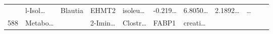 \documentclass[
]{article}
\begin{document}
\begin{longtable}[]{@{}lllllllllll@{}}
\begin{minipage}[t]{0.07\columnwidth}
\strut
\end{minipage} & \begin{minipage}[t]{0.09\columnwidth}\raggedright
l-Isol\ldots{}\strut
\end{minipage} & \begin{minipage}[t]{0.07\columnwidth}\raggedright
Blautia\strut
\end{minipage} & \begin{minipage}[t]{0.07\columnwidth}\raggedright
EHMT2\strut
\end{minipage} & \begin{minipage}[t]{0.09\columnwidth}\raggedright
isoleu\ldots{}\strut
\end{minipage} & \begin{minipage}[t]{0.07\columnwidth}\raggedright
-0.219\ldots{}\strut
\end{minipage} & \begin{minipage}[t]{0.07\columnwidth}\raggedright
6.8050\ldots{}\strut
\end{minipage} & \begin{minipage}[t]{0.07\columnwidth}\raggedright
2.1892\ldots{}\strut
\end{minipage} & \begin{minipage}[t]{0.03\columnwidth}\raggedright
\ldots{}\strut
\end{minipage}\tabularnewline
\begin{minipage}[t]{0.05\columnwidth}\raggedright
588\strut
\end{minipage} & \begin{minipage}[t]{0.07\columnwidth}\raggedright
Metabo\ldots{}\strut
\end{minipage} & \begin{minipage}[t]{0.07\columnwidth}\raggedright
\strut
\end{minipage} & \begin{minipage}[t]{0.09\columnwidth}\raggedright
2-Imin\ldots{}\strut
\end{minipage} & \begin{minipage}[t]{0.07\columnwidth}\raggedright
Clostr\ldots{}\strut
\end{minipage} & \begin{minipage}[t]{0.07\columnwidth}\raggedright
FABP1\strut
\end{minipage} & \begin{minipage}[t]{0.09\columnwidth}\raggedright
creati\ldots{}\strut
\end{minipage} & \begin{minipage}[t]{0.07\columnwidth}\raggedright

\end{minipage}
\end{longtable}
\end{document}
